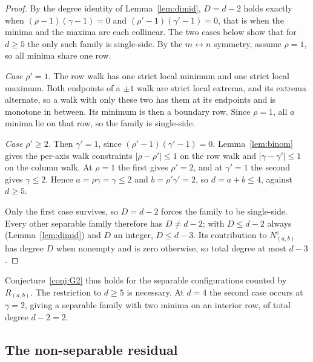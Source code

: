 \documentclass[11pt]{article}
\theoremstyle{definition}
\theoremstyle{remark}
\begin{document}
\begin{proof}
By the degree identity of Lemma~\ref{lem:dimid}, $D=d-2$ holds exactly when
$(\rho-1)(\gamma-1)=0$ and $(\rho'-1)(\gamma'-1)=0$, that is when the minima and
the maxima are each collinear. The two cases below show that for $d\ge5$ the only
such family is single-side. By the $m\leftrightarrow n$ symmetry, assume $\rho=1$,
so all minima share one row.

\medskip\noindent\emph{Case $\rho'=1$.} The row walk has one strict local minimum
and one strict local maximum. Both endpoints of a $\pm1$ walk are strict local
extrema, and its extrema alternate, so a walk with only these two has them at its
endpoints and is monotone in between. Its minimum is then a boundary row. Since $\rho=1$, all $a$ minima lie on that row, so the family is single-side.

\medskip\noindent\emph{Case $\rho'\ge2$.} Then $\gamma'=1$, since $(\rho'-1)(\gamma'-1)=0$. Lemma~\ref{lem:binom}
gives the per-axis walk constraints $|\rho-\rho'|\le1$ on the row walk and
$|\gamma-\gamma'|\le1$ on the column walk. At $\rho=1$ the first gives $\rho'=2$,
and at $\gamma'=1$ the second gives $\gamma\le2$. Hence
$a=\rho\gamma=\gamma\le2$ and $b=\rho'\gamma'=2$, so $d=a+b\le4$, against
$d\ge5$.

\medskip\noindent
Only the first case survives, so $D=d-2$ forces the family to be single-side. Every
other separable family therefore has $D\ne d-2$; with $D\le d-2$ always
(Lemma~\ref{lem:dimid}) and $D$ an integer, $D\le d-3$. Its contribution to
$N^{\mathrm{s}}_{(a,b)}$ has degree $D$ when nonempty and is zero otherwise, so
total degree at most $d-3$.
\end{proof}

Conjecture~\ref{conj:G2} thus holds for the separable configurations counted by
$R_{(a,b)}$.
The restriction to $d\ge5$ is necessary. At $d=4$ the second case occurs
at $\gamma=2$, giving a separable family with two minima on an interior row, of
total degree $d-2=2$.

\subsection{The non-separable residual}
\end{document}
